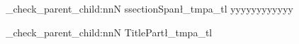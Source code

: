 \documentclass{article}
\begin{document}


\tag_check_parent_child:nnN {ssection}{Span}\l_tmpa_tl
yyyyyyyyyyyy


\tag_check_parent_child:nnN {Title}{Part}\l_tmpa_tl

\tagstructend
\ExplSyntaxOff
\end{document}
